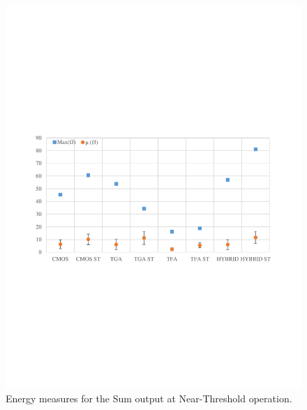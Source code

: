 \documentclass[ecp,tc, english]{iiufrgs}
\begin{document}
\begin{figure}[H]
\centering
\includegraphics[width=\textwidth, trim={0 9cm 0 9cm},clip]{energyNTSum.pdf}
\caption{Energy measures for the Sum output at Near-Threshold operation.}
\label{fig:energyNTS}
\end{figure}
\end{document}

